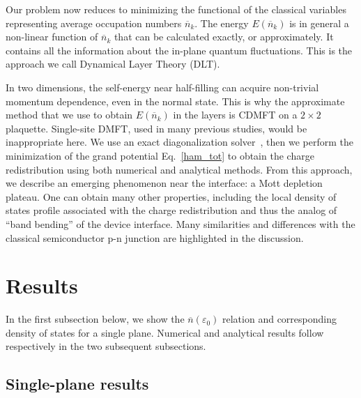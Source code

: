 \documentclass[twocolumn, preprintnumbers,prb,aps,amssymb,showpacs]{revtex4}
\begin{document}
Our problem now reduces to minimizing the functional of the classical variables representing average occupation numbers $\overline{n}_{k}$. The energy $E(\overline{n}_{k})$ is in general a non-linear function of $\overline{n}_{k}$ that can be calculated exactly, or approximately. It contains all the information about the in-plane quantum fluctuations. This is the approach we call Dynamical Layer Theory (DLT). 

In two dimensions, the self-energy near half-filling can acquire non-trivial momentum dependence, even in the normal state. This is why the approximate method that we use to obtain $E(\overline{n}_{k})$ in the layers is CDMFT on a $2\times 2$ plaquette. Single-site DMFT, used in many previous studies, would be inappropriate here. We use an exact diagonalization solver~\cite{Caffarel:1994,Capone:2004,LTP:2006,SenechalBath:2010,SenechalMancini:2011}, then we perform the minimization of the grand potential Eq.~\eqref{ham_tot} to obtain the charge redistribution using both numerical and analytical methods. From this approach, we describe an emerging phenomenon near the interface: a Mott depletion plateau. One can obtain many other properties, including the local density of states profile associated with the charge redistribution and thus the analog of ``band bending'' of the device interface. Many similarities and differences with the classical semiconductor p-n junction are highlighted in the discussion.

\section{Results}\label{Results}

In the first subsection below, we show the $\overline{n}(\varepsilon_0)$ relation and corresponding density of states for a single plane. Numerical and analytical results follow respectively in the two subsequent subsections.

\subsection{Single-plane results}


\end{document}
